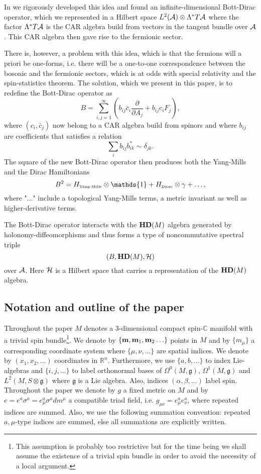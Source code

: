 \documentclass[letterpaper,11pt]{article}
\def\a{\alpha}
\def\b{\beta}
\def\d{\delta}
\def\m{\mu}
\def\n{\nu}
\def\OO{\Omega}
\def\ca{{\cal A}}
\def\ch{{\cal H}}
\newcommand{\pa}{\partial}
\begin{document}
In \cite{Aastrup:2019yui} we rigorously developed this idea and found an infinite-dimensional Bott-Dirac operator, which we represented in a Hilbert space $L^2(\ca)\otimes \Lambda^* T\ca$ where the factor $\Lambda^* T\ca$ is the CAR algebra build from vectors in the tangent bundle over $\ca$. This CAR algebra then gave rise to the fermionic sector.

There is, however, a problem with this idea, which is that the fermions will a priori be one-forms, i.e. there will be a one-to-one correspondence between the bosonic and the fermionic sectors, which is at odds with special relativity and the spin-statistics theorem. 
The solution, which we present in this paper, is to redefine the Bott-Dirac operator as
$$
B= \sum_{i,j=1}^\infty \left( b_{ij}\bar{c}_i \frac{\pa}{\pa A_j} + b_{ij}{c}_i F_j\right),
$$
where $(c_i,\bar{c}_j)$ now belong to a CAR algebra build from spinors and where $b_{ij}$ are coefficients that satisfies a relation
$$
\sum_i b_{ij} b_{ik}^* \sim \d_{jk}.
$$
The square of the new Bott-Dirac operator then produces both the Yang-Mills and the Dirac Hamiltonians
$$
B^2= H_{\mbox{\tiny Yang-Mills}}\otimes \mathds{1} + H_{\mbox{\tiny Dirac}} \otimes \gamma + \ldots,
$$
where "$\ldots$" include a topological Yang-Mills terms, a metric invariant as well as higher-derivative terms.

The Bott-Dirac operator interacts with the ${\bf HD}(M)$ algebra generated by holonomy-diffeomorphisms and thus forms a type of noncommutative spectral triple
$$
(B, {\bf HD}(M), \ch )
$$
over $\ca$. Here $\ch$ is a Hilbert space that carries a representation of the ${\bf HD}(M)$ algebra. 



\subsection{Notation and outline of the paper}



Throughout the paper $M$ denotes a 3-dimensional compact spin-$\mathbb{C}$ manifold with a trivial spin bundle\footnote{This assumption is probably too restrictive but for the time being we shall assume the existence of a trivial spin bundle in order to avoid the necessity of a local argument.}. We denote by $\{{\bf m},{\bf m}_1,{\bf m}_2 \ldots\}$ points in $M$ and by $\{m_\m\}$ a corresponding coordinate system where $\{\m,\n, \ldots\}$ are spatial indices. We denote by $(x_1,x_2,\ldots)$ coordinates in $\mathbb{R}^n$. Furthermore, we use $\{a,b,\ldots\}$ to index Lie-algebras and $\{i,j,\ldots\}$ to label orthonormal bases of $\OO^0(M,\mathfrak{g})$, $\OO^1(M,\mathfrak{g})$ and $L^2(M,S\otimes \mathfrak{g})$ where $\mathfrak{g}$ is a Lie algebra. Also, indices $({\a,\b, \ldots})$ label spin.
Throughout the paper we denote by $g$ a fixed metric on $M$ and by $e= e^a\sigma^a= e_\m^a\sigma^a dm^\m $ a compatible triad field, i.e. $g_{\m\n}= e^a_\m e^a_\n$, where repeated indices are summed.  
Also, we use the following summation convention: repeated $a,\mu$-type indices are summed, else all summations are explicitly written.\\
\end{document}
